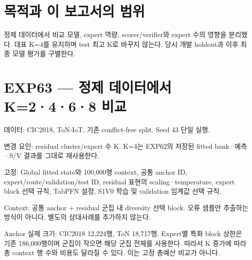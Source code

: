 




\section*{목적과 이 보고서의 범위}

정제 데이터에서 비교 모델, expert 역량, scorer/\allowbreak{}verifier와 expert 수의 영향을 분리했다. 대표 K=\allowbreak{}4를 유지하며 test 최고 K로 바꾸지 않는다. 당시 개발 holdout과 이후 최종 모델 평가를 구별한다.


\section{EXP63 — 정제 데이터에서 K=\allowbreak{}2·4·6·8 비교}
\par\noindent \textbullet\enspace 데이터: CIC2018, ToN-IoT, 기존 conflict-free split. Seed 43 단일 실행.


\par\noindent \textbullet\enspace 변경 요인: residual cluster/\allowbreak{}expert 수 K. K=\allowbreak{}4는 EXP62의 저장된 fitted bank·예측·S/\allowbreak{}V 결과를 그대로 재사용한다.


\par\noindent \textbullet\enspace 고정: Global fitted state와 100,000행 context, 공통 anchor ID, expert/\allowbreak{}route/\allowbreak{}validation/\allowbreak{}test ID, residual 표현의 scaling·temperature, expert block 선택 규칙, TabPFN 설정, S1V0 학습 및 validation 임계값 선택 규칙.


\par\noindent \textbullet\enspace Context: 공통 anchor +\allowbreak{} residual 군집 내 diversity 선택 block. 오류 샘플만 추출하는 방식이 아니다. 별도의 상대사례를 추가하지 않는다.


\par\noindent \textbullet\enspace Anchor 실제 크기: CIC2018 12,224행, ToN 18,717행. Expert별 특화 block 상한은 기존 186,000행이며 군집이 작으면 해당 군집 전체를 사용한다. 따라서 K 증가에 따라 총 context 행 수와 비용도 달라질 수 있다. 이는 고정 총예산 비교가 아니다.


